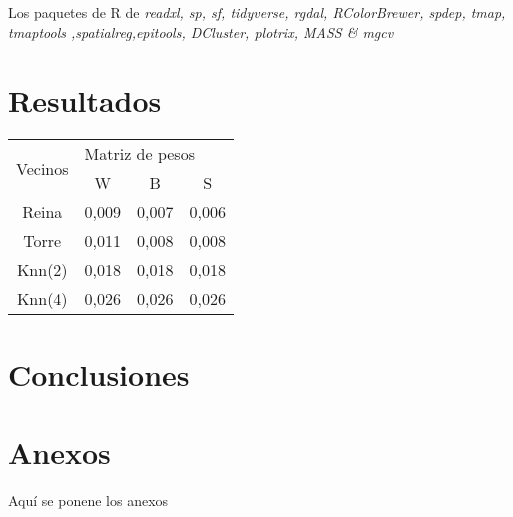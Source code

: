\documentclass[12pt,a4paper]{article}
\begin{document}
Los paquetes de R de \textit{readxl, sp, sf, tidyverse, rgdal, RColorBrewer, spdep, tmap, tmaptools ,spatialreg,epitools, DCluster, plotrix, MASS \& mgcv}
\section{Resultados}

\begin{table}[h]
\centering
\begin{tabular}{cccc}
\hline
\multirow{2}{*}{Vecinos} & \multicolumn{3}{l}{Matriz de pesos}\\ \cline{2-4} 
&W&B&S\\ \hline
Reina&0,009&0,007&0,006\\
Torre&0,011&0,008&0,008\\
Knn(2)&0,018&0,018&0,018\\
Knn(4)&0,026&0,026&0,026\\ \hline
\end{tabular}
\end{table}

\section{Conclusiones}

\section{Anexos}
Aquí se ponene los anexos



\end{document}
